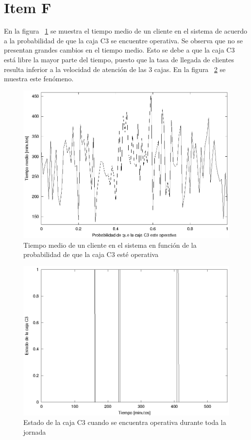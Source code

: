 \documentclass[a4paper,10pt]{article}
\begin{document}
\section*{Item F}

En la figura ~\ref{fig:probac3} se muestra el tiempo medio de un cliente
en el sistema de acuerdo a la probabilidad de que la caja C3 se encuentre
operativa. Se observa que no se presentan grandes cambios en el tiempo medio.
Esto se debe a que la caja C3 est\'a libre la mayor parte del tiempo, puesto
que la tasa de llegada de clientes resulta inferior a la velocidad de atenci\'on
de las 3 cajas. En la figura ~\ref{fig:operativac3} se muestra este fen\'omeno.

\begin{figure}[hp]
\centering
\includegraphics{graficos/plot_probabilidad_c3.eps}
\caption{Tiempo medio de un cliente en el sistema en funci\'on de la probabilidad
de que la caja C3 est\'e operativa}
\label{fig:probac3}
\end{figure}


\begin{figure}[hp]
\centering
\includegraphics{graficos/plot_operatividad_c3.eps}
\caption{Estado de la caja C3 cuando se encuentra operativa durante toda la 
jornada}
\label{fig:operativac3}
\end{figure}
\end{document}
